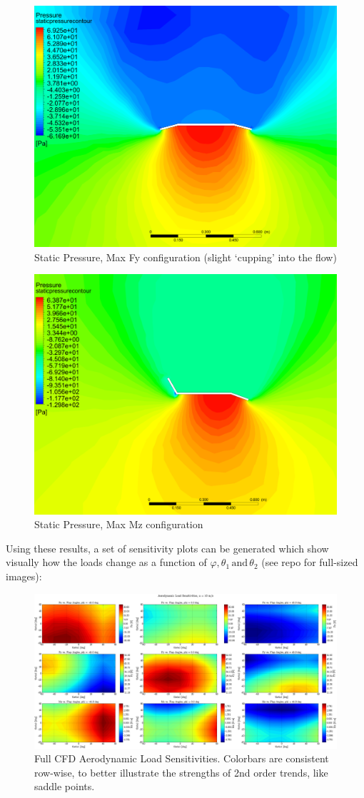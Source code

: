 \documentclass[12pt]{article}
\begin{document}
\begin{figure}[h!]
\centering
\includegraphics[width=.6\linewidth]{../cfd_figures/max_fy_config_static_pressure.png}
\caption{Static Pressure, Max Fy configuration (slight `cupping' into the flow)}
\end{figure}

\clearpage

\begin{figure}[h!]
\centering
\includegraphics[width=.6\linewidth]{../cfd_figures/max_mz_config_static_pressure.png}
\caption{Static Pressure, Max Mz configuration}
\end{figure}

Using these results, a set of sensitivity plots can be generated which show visually how the loads change as a function of $\varphi, \theta_1 \, \text{and} \, \theta_2$ (see repo for full-sized images):

\begin{figure}[h!]
\centering
\includegraphics[width=1.0\linewidth]{../cfd_parameter_study/full_aero_load_sensitivities.png}
\caption{Full CFD Aerodynamic Load Sensitivities.  Colorbars are consistent row-wise, to better illustrate the strengths of 2nd order trends, like saddle points.}
\end{figure}
\end{document}
